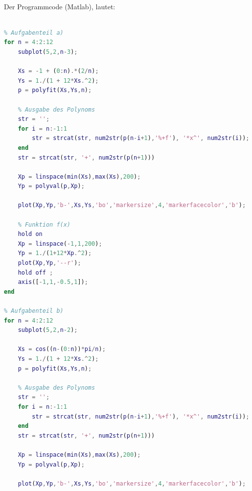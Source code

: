 \documentclass[a4paper]{scrartcl}
\begin{document}
\begin{aufgabe}~

	Der Programmcode (Matlab), lautet:
	\begin{lstlisting}[language=matlab]
% Stephan Hilb, 2706616

% Aufgabenteil a)
for n = 4:2:12
    subplot(5,2,n-3);
    
    Xs = -1 + (0:n).*(2/n);
    Ys = 1./(1 + 12*Xs.^2);
    p = polyfit(Xs,Ys,n);
    
    % Ausgabe des Polynoms
    str = '';
    for i = n:-1:1
        str = strcat(str, num2str(p(n-i+1),'%+f'), '*x^', num2str(i));
    end
    str = strcat(str, '+', num2str(p(n+1)))
    
    Xp = linspace(min(Xs),max(Xs),200);
    Yp = polyval(p,Xp);
    
    plot(Xp,Yp,'b-',Xs,Ys,'bo','markersize',4,'markerfacecolor','b');
    
    % Funktion f(x)
    hold on
    Xp = linspace(-1,1,200);
    Yp = 1./(1+12*Xp.^2);
    plot(Xp,Yp,'--r');
    hold off ;
    axis([-1,1,-0.5,1]);
end

% Aufgabenteil b)
for n = 4:2:12
    subplot(5,2,n-2);
    
    Xs = cos((n-(0:n))*pi/n);
    Ys = 1./(1 + 12*Xs.^2);
    p = polyfit(Xs,Ys,n);
    
    % Ausgabe des Polynoms
    str = '';
    for i = n:-1:1
        str = strcat(str, num2str(p(n-i+1),'%+f'), '*x^', num2str(i));
    end
    str = strcat(str, '+', num2str(p(n+1)))
    
    Xp = linspace(min(Xs),max(Xs),200);
    Yp = polyval(p,Xp);
    
    plot(Xp,Yp,'b-',Xs,Ys,'bo','markersize',4,'markerfacecolor','b'); 
    

\end{lstlisting}
\end{aufgabe}
\end{document}
